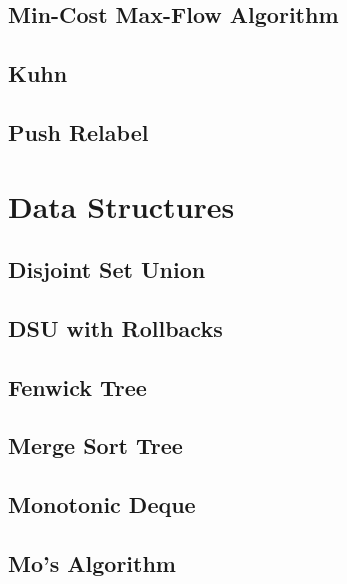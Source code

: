 \subsection{Min-Cost Max-Flow Algorithm}
\raggedbottom
\hrulefill
\subsection{Kuhn}
\raggedbottom
\hrulefill
\subsection{Push Relabel}
\raggedbottom
\hrulefill



\section{Data Structures}
\subsection{Disjoint Set Union}
\raggedbottom
\hrulefill
\subsection{DSU with Rollbacks}
\raggedbottom
\hrulefill
\subsection{Fenwick Tree}
\raggedbottom
\hrulefill
\subsection{Merge Sort Tree}
\raggedbottom
\hrulefill
\subsection{Monotonic Deque}
\raggedbottom
\hrulefill
\subsection{Mo's Algorithm}
\raggedbottom
\hrulefill
